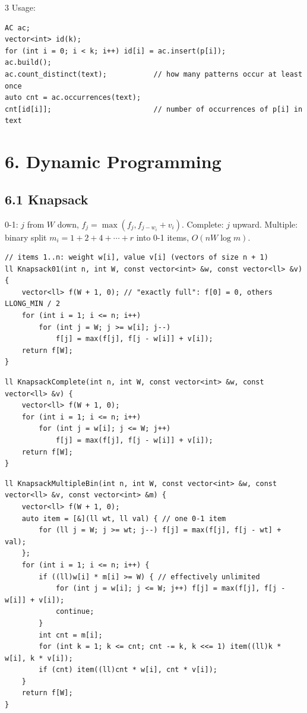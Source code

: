 \documentclass[8pt]{extarticle}
\begin{document}
\begin{multicols*}{3}
Usage:

\begin{lstlisting}
AC ac;
vector<int> id(k);
for (int i = 0; i < k; i++) id[i] = ac.insert(p[i]);
ac.build();
ac.count_distinct(text);           // how many patterns occur at least once
auto cnt = ac.occurrences(text);
cnt[id[i]];                        // number of occurrences of p[i] in text
\end{lstlisting}

\section*{6. Dynamic Programming}

\subsection*{6.1 Knapsack}

0-1: $j$ from $W$ down, $f_j = \max(f_j, f_{j-w_i} + v_i)$. Complete: $j$ upward. Multiple: binary split $m_i = 1 + 2 + 4 + \cdots + r$ into 0-1 items, $O(nW \log m)$.

\begin{lstlisting}
// items 1..n: weight w[i], value v[i] (vectors of size n + 1)
ll Knapsack01(int n, int W, const vector<int> &w, const vector<ll> &v) {
    vector<ll> f(W + 1, 0); // "exactly full": f[0] = 0, others LLONG_MIN / 2
    for (int i = 1; i <= n; i++)
        for (int j = W; j >= w[i]; j--)
            f[j] = max(f[j], f[j - w[i]] + v[i]);
    return f[W];
}
\end{lstlisting}

\begin{lstlisting}
ll KnapsackComplete(int n, int W, const vector<int> &w, const vector<ll> &v) {
    vector<ll> f(W + 1, 0);
    for (int i = 1; i <= n; i++)
        for (int j = w[i]; j <= W; j++)
            f[j] = max(f[j], f[j - w[i]] + v[i]);
    return f[W];
}
\end{lstlisting}

\begin{lstlisting}
ll KnapsackMultipleBin(int n, int W, const vector<int> &w, const vector<ll> &v, const vector<int> &m) {
    vector<ll> f(W + 1, 0);
    auto item = [&](ll wt, ll val) { // one 0-1 item
        for (ll j = W; j >= wt; j--) f[j] = max(f[j], f[j - wt] + val);
    };
    for (int i = 1; i <= n; i++) {
        if ((ll)w[i] * m[i] >= W) { // effectively unlimited
            for (int j = w[i]; j <= W; j++) f[j] = max(f[j], f[j - w[i]] + v[i]);
            continue;
        }
        int cnt = m[i];
        for (int k = 1; k <= cnt; cnt -= k, k <<= 1) item((ll)k * w[i], k * v[i]);
        if (cnt) item((ll)cnt * w[i], cnt * v[i]);
    }
    return f[W];
}
\end{lstlisting}


\end{multicols*}
\end{document}
